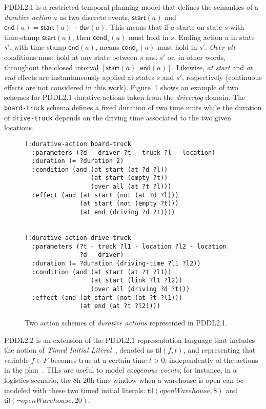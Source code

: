 \documentclass{ecai}
\newcommand{\cond}{\mathsf{cond}}  %
\newcommand{\dur}{\mathsf{dur}}    %
\newcommand{\start}{\mathsf{start}}%
\newcommand{\en}{\mathsf{end}}     %
\newcommand{\til}{\mathsf{til}}    %
\begin{document}
PDDL2.1 is a restricted temporal planning model that defines the semantics of a {\em durative action} $a$ as two discrete events, $\start(a)$ and $\en(a)=\start(a)+\dur(a)$. This means that if $a$ starts on state $s$ with time-stamp $\start(a)$, then $\cond_s(a)$ must hold in $s$. Ending action $a$ in state $s'$, with time-stamp $\en(a)$, means $\cond_e(a)$ must hold in $s'$. {\em Over all} conditions must hold at any state between $s$ and $s'$ or, in other words, throughout the closed interval $[\start(a)..\en(a)]$. Likewise, {\em at start} and {\em at end} effects are instantaneously applied at states $s$ and $s'$, respectively (continuous effects are not considered in this work). Figure~\ref{fig:exampleactions2} shows an example of two schemes for PDDL2.1 durative actions taken from the {\em driverlog} domain. The \texttt{board-truck} schema defines a fixed duration of two time units while the duration of \texttt{drive-truck} depends on the driving time associated to the two given locations.

\begin{figure}
\begin{footnotesize}    
\begin{verbatim}
(:durative-action board-truck
  :parameters (?d - driver ?t - truck ?l - location)
  :duration (= ?duration 2)
  :condition (and (at start (at ?d ?l)) 
                  (at start (empty ?t))
                  (over all (at ?t ?l)))
  :effect (and (at start (not (at ?d ?l))) 
               (at start (not (empty ?t)))
               (at end (driving ?d ?t))))


(:durative-action drive-truck
  :parameters (?t - truck ?l1 - location ?l2 - location 
               ?d - driver)
  :duration (= ?duration (driving-time ?l1 ?l2))
  :condition (and (at start (at ?t ?l1)) 
                  (at start (link ?l1 ?l2))
                  (over all (driving ?d ?t)))
  :effect (and (at start (not (at ?t ?l1))) 
               (at end (at ?t ?l2))))
\end{verbatim}
\end{footnotesize}    
\caption{Two action schemes of {\em durative actions} represented in PDDL2.1.}
\label{fig:exampleactions2}
\end{figure}

PDDL2.2 is an extension of the PDDL2.1 representation language that includes the notion of {\em Timed Initial Literal}~\cite{hoffmann2005}, denoted as $\til(f,t)$, and representing that variable $f\in F$ becomes true at a certain time $t>0$, independently of the actions in the plan~\cite{Edelkamp04}. TILs are useful to model {\em exogenous events}; for instance, in a logistics scenario, the 8h-20h time window when a warehouse is open can be modeled with these two timed initial literals: $\til(openWarehouse,8)$ and $\til(\neg openWarehouse,20)$.
\end{document}
